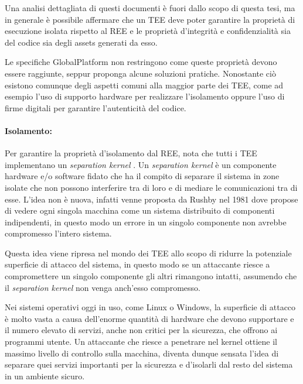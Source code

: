 \documentclass[12pt,italian]{report}
\begin{document}
Una analisi dettagliata di questi documenti è fuori dallo scopo di questa
tesi, ma in generale è possibile affermare che un TEE deve poter garantire
la proprietà di esecuzione isolata rispetto al REE e le proprietà d'integrità
e confidenzialità sia del codice sia degli assets generati da esso.

Le specifiche GlobalPlatform non restringono come queste proprietà devono
essere raggiunte, seppur proponga alcune soluzioni pratiche.
Nonostante ciò esistono comunque degli aspetti comuni alla maggior parte dei
TEE, come ad esempio l'uso di supporto hardware per realizzare l'isolamento
oppure l'uso di firme digitali per garantire l'autenticità del codice.


\paragraph{Isolamento:}
Per garantire la proprietà d'isolamento dal REE, \cite{sabt2015tee} nota
che tutti i TEE implementano un \textit{separation kernel}
\cite{rushby1981separationkernel}. 
Un \textit{separation kernel} è un componente hardware e/o software fidato che
ha il compito di separare il sistema in zone isolate che non possono
interferire tra di loro e di mediare le comunicazioni tra di esse.
L'idea non è nuova, infatti venne proposta da Rushby nel 1981 dove propose
di vedere ogni singola macchina come un sistema distribuito di componenti
indipendenti, in questo modo un errore in un singolo componente non avrebbe
compromesso l'intero sistema.

Questa idea viene ripresa nel mondo dei TEE allo scopo di ridurre la
potenziale superficie di attacco del sistema, in questo modo se un
attaccante riesce a compromettere un singolo componente gli altri rimangono
intatti, assumendo che il \textit{separation kernel} non venga anch'esso
compromesso.

Nei sistemi operativi oggi in uso, come Linux o Windows, la superficie di
attacco è molto vasta a causa dell'enorme quantità di hardware che devono
supportare e il numero elevato di servizi, anche non critici per la sicurezza,
che offrono ai programmi utente. 
Un attaccante che riesce a penetrare nel kernel ottiene il massimo livello di
controllo sulla macchina, diventa dunque sensata l'idea di separare quei
servizi importanti per la sicurezza e d'isolarli dal resto del sistema in
un ambiente sicuro.
\end{document}
